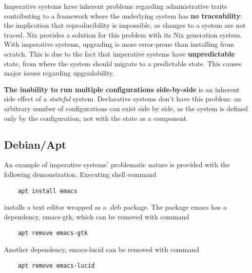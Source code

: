 Imperative systems have inherent problems regarding
administrative traits contributing to a framework where the underlying
system has \textbf{no traceability}: the implication that
reproducibility is impossible, as changes to a system are not
traced. Nix provides a solution for this problem with its Nix
generation system. With
imperative systems, upgrading is more error-prone than installing from
scratch. This is due to the fact that imperative systems have
\textbf{unpredictable} state, from where the system should migrate to
a predictable state. This causes major issues regarding
upgradability. \cite{dolstra2007purely}

\textbf{The inability to run multiple configurations side-by-side} is
an inherent side effect of a \textit{stateful} system. Declarative
systems don't have this problem: an arbitrary number of configurations
can exist side by side, as the system is defined only by the
configuration, not with the state as a
component. \cite{dolstra2007purely}

\subsection{Debian/Apt} \label{debian/apt}

An example of imperative systems' problematic nature is provided with
the following demonstration. Executing shell command
\begin{lstlisting}
    apt install emacs
\end{lstlisting}
installs a text editor wrapped as a .deb package.  The package emacs
has a dependency, emacs-gtk, which can be removed with command
\begin{lstlisting}
    apt remove emacs-gtk
\end{lstlisting}
Another dependency, emacs-lucid can be removed with command
\begin{lstlisting}
    apt remove emacs-lucid
\end{lstlisting}

